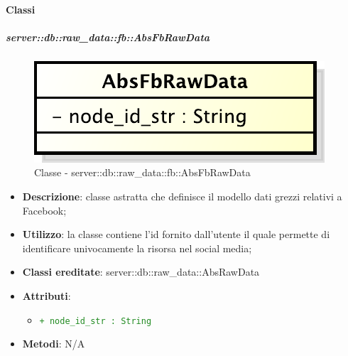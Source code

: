 		\paragraph{Classi} %
			\subparagraph{server::db::raw\_data::fb::AbsFbRawData} %
			\label{subp:server_db_raw_data_fb_absfbrawdata}
				\begin{figure}[htbp]
					\centering
					\centerline{\includegraphics[scale=0.75]{./images/server/classes/db/abs_fb_raw_data.pdf}}
					\caption{Classe - server::db::raw\_data::fb::AbsFbRawData}
				\end{figure}
				\begin{itemize}
					\item \textbf{Descrizione}: classe astratta che definisce il modello dati grezzi relativi a Facebook;
					\item \textbf{Utilizzo}: la classe contiene l'id fornito dall'utente il quale permette di identificare univocamente la risorsa nel social media;
					\item \textbf{Classi ereditate}: server::db::raw\_data::AbsRawData
					\item \textbf{Attributi}:
					\begin{itemize}
						\item \textcolor{forestgreen}{\texttt{+ node\_id\_str : String}}
					\end{itemize}
					\item \textbf{Metodi}: N/A
				\end{itemize}


